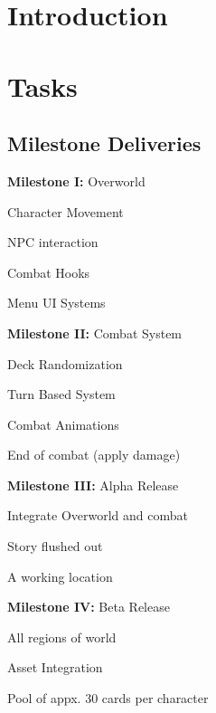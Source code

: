 \documentclass[12pt,titlepage]{article}
\begin{document}
\section{Introduction}

\section{Tasks}

\subsection{Milestone Deliveries}
    \begin{todolist}
        \item \textbf{Milestone I:} Overworld
            \begin{todolist}
                \item Character Movement
                \item NPC interaction
                \item Combat Hooks
                \item Menu UI Systems
            \end{todolist}
        \item \textbf{Milestone II:} Combat System
            \begin{todolist}
                \item Deck Randomization
                \item Turn Based System
                \item Combat Animations
                \item End of combat (apply damage)
            \end{todolist}    
        \item \textbf{Milestone III:} Alpha Release
            \begin{todolist}
                \item Integrate Overworld and combat
                \item Story flushed out
                \item A working location
            \end{todolist}
        \item \textbf{Milestone IV:} Beta Release
            \begin{todolist}
                \item All regions of world
                \item Asset Integration
                \item Pool of appx. 30 cards per character

\end{todolist}
\end{todolist}
\end{document}
